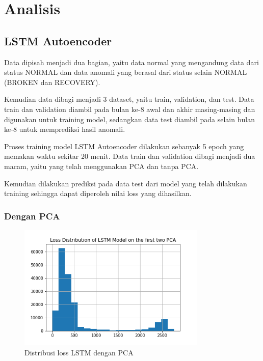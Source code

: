 \chapter{Analisis}

\section{LSTM Autoencoder}

Data dipisah menjadi dua bagian, yaitu data normal yang mengandung data dari status NORMAL dan data anomali yang berasal dari status selain NORMAL (BROKEN dan RECOVERY).

Kemudian data dibagi menjadi 3 dataset, yaitu train, validation, dan test. Data train dan validation diambil pada bulan ke-8 awal dan akhir masing-masing dan digunakan untuk training model, sedangkan data test diambil pada selain bulan ke-8 untuk memprediksi hasil anomali.

Proses training model LSTM Autoencoder dilakukan sebanyak 5 epoch yang memakan waktu sekitar 20 menit. Data train dan validation dibagi menjadi dua macam, yaitu yang telah menggunakan PCA dan tanpa PCA.

Kemudian dilakukan prediksi pada data test dari model yang telah dilakukan training sehingga dapat diperoleh nilai loss yang dihasilkan.

    \subsection{Dengan PCA}

    \begin{figure}[h]
        \centering
        \includegraphics[width=0.8\textwidth]{resources/LSTM/LSTM_PCA_LossDist.png}
        \caption{Distribusi loss LSTM dengan PCA}
    \end{figure}

